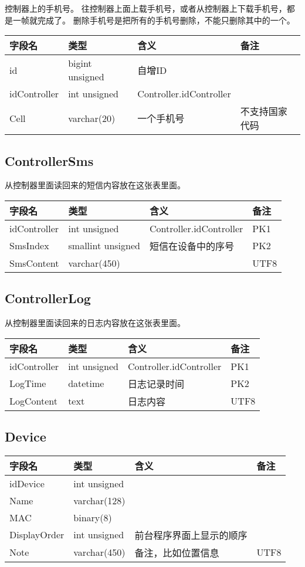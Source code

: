 控制器上的手机号。
往控制器上面上载手机号，或者从控制器上下载手机号，都是一帧就完成了。
删除手机号是把所有的手机号删除，不能只删除其中的一个。

\begin{longtabu}[c]{@{}lXXX@{}}
\toprule
字段名 & 类型 & 含义 & 备注\tabularnewline
\midrule
\endhead
id & bigint unsigned & 自增ID &\tabularnewline
idController & int unsigned & Controller.idController &\tabularnewline
Cell & varchar(20) & 一个手机号 & 不支持国家代码\tabularnewline
\bottomrule
\end{longtabu}

\subsection{ControllerSms}\label{controllersms}

从控制器里面读回来的短信内容放在这张表里面。

\begin{longtabu}[c]{@{}lXXX@{}}
\toprule
字段名 & 类型 & 含义 & 备注\tabularnewline
\midrule
\endhead
idController & int unsigned & Controller.idController &
PK1\tabularnewline
SmsIndex & smallint unsigned & 短信在设备中的序号 & PK2\tabularnewline
SmsContent & varchar(450) & & UTF8\tabularnewline
\bottomrule
\end{longtabu}

\subsection{ControllerLog}\label{controllerlog}

从控制器里面读回来的日志内容放在这张表里面。

\begin{longtabu}[c]{@{}lXXX@{}}
\toprule
字段名 & 类型 & 含义 & 备注\tabularnewline
\midrule
\endhead
idController & int unsigned & Controller.idController &
PK1\tabularnewline
LogTime & datetime & 日志记录时间 & PK2\tabularnewline
LogContent & text & 日志内容 & UTF8\tabularnewline
\bottomrule
\end{longtabu}

\subsection{Device}\label{device}

\begin{longtabu}[c]{@{}lXXX@{}}
\toprule
字段名 & 类型 & 含义 & 备注\tabularnewline
\midrule
\endhead
idDevice & int unsigned & &\tabularnewline
Name & varchar(128) & &\tabularnewline
MAC & binary(8) & &\tabularnewline
DisplayOrder & int unsigned & 前台程序界面上显示的顺序 &\tabularnewline
Note & varchar(450) & 备注，比如位置信息 & UTF8\tabularnewline
\bottomrule
\end{longtabu}

